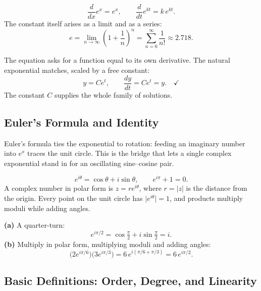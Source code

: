 \documentclass[11pt]{article}
\begin{document}
\begin{formulabox}
\[
    \frac{d}{dx}e^{x} = e^{x}, \qquad
    \frac{d}{dt}e^{kt} = k\,e^{kt}.
\]
The constant itself arises as a limit and as a series:
\[
    e = \lim_{n\to\infty}\left(1 + \frac{1}{n}\right)^{n}
      = \sum_{n=0}^{\infty}\frac{1}{n!} \approx 2.718.
\]
\end{formulabox}

\begin{examplebox}[Worked Example 1.2: Solve $\frac{dy}{dt} = y$]
The equation asks for a function equal to its own derivative. The natural
exponential matches, scaled by a free constant:
\[ y = Ce^{t}, \qquad \frac{dy}{dt} = Ce^{t} = y. \quad\checkmark \]
The constant $C$ supplies the whole family of solutions.
\end{examplebox}

\subsection{Euler's Formula and Identity}

Euler's formula ties the exponential to rotation: feeding an imaginary number
into $e^{x}$ traces the unit circle. This is the bridge that lets a single
complex exponential stand in for an oscillating sine--cosine pair.

\begin{formulabox}
\[
    e^{i\theta} = \cos\theta + i\sin\theta, \qquad
    e^{i\pi} + 1 = 0.
\]
A complex number in polar form is $z = re^{i\theta}$, where $r = |z|$ is the
distance from the origin. Every point on the unit circle has $\big|e^{i\theta}\big| = 1$,
and products multiply moduli while adding angles.
\end{formulabox}

\begin{examplebox}
\textbf{(a)} A quarter-turn:
\[ e^{i\pi/2} = \cos\tfrac{\pi}{2} + i\sin\tfrac{\pi}{2} = i. \]
\textbf{(b)} Multiply in polar form, multiplying moduli and adding angles:
\[ \big(2e^{i\pi/6}\big)\big(3e^{i\pi/3}\big) = 6\,e^{i(\pi/6 + \pi/3)} = 6\,e^{i\pi/2}. \]
\end{examplebox}

\subsection{Basic Definitions: Order, Degree, and Linearity}
\end{document}
